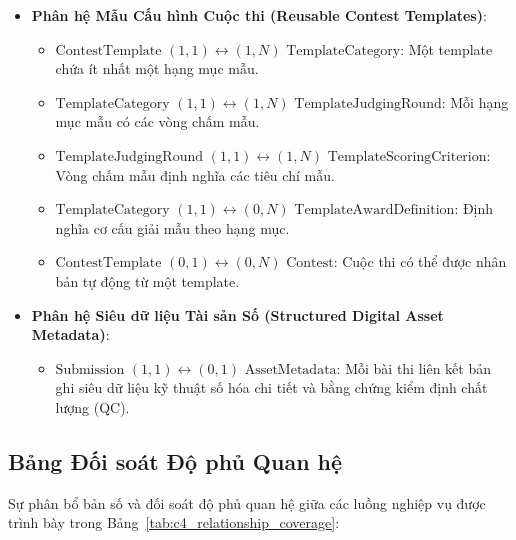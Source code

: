 \begin{itemize}
    \item \textbf{Phân hệ Mẫu Cấu hình Cuộc thi (Reusable Contest Templates)}:
    \begin{itemize}
        \item $\text{ContestTemplate } (1,1) \longleftrightarrow (1,N) \text{ TemplateCategory}$: Một template chứa ít nhất một hạng mục mẫu.
        \item $\text{TemplateCategory } (1,1) \longleftrightarrow (1,N) \text{ TemplateJudgingRound}$: Mỗi hạng mục mẫu có các vòng chấm mẫu.
        \item $\text{TemplateJudgingRound } (1,1) \longleftrightarrow (1,N) \text{ TemplateScoringCriterion}$: Vòng chấm mẫu định nghĩa các tiêu chí mẫu.
        \item $\text{TemplateCategory } (1,1) \longleftrightarrow (0,N) \text{ TemplateAwardDefinition}$: Định nghĩa cơ cấu giải mẫu theo hạng mục.
        \item $\text{ContestTemplate } (0,1) \longleftrightarrow (0,N) \text{ Contest}$: Cuộc thi có thể được nhân bản tự động từ một template.
    \end{itemize}
    \item \textbf{Phân hệ Siêu dữ liệu Tài sản Số (Structured Digital Asset Metadata)}:
    \begin{itemize}
        \item $\text{Submission } (1,1) \longleftrightarrow (0,1) \text{ AssetMetadata}$: Mỗi bài thi liên kết bản ghi siêu dữ liệu kỹ thuật số hóa chi tiết và bằng chứng kiểm định chất lượng (QC).
    \end{itemize}
\end{itemize}

\subsection{Bảng Đối soát Độ phủ Quan hệ}
Sự phân bổ bản số và đối soát độ phủ quan hệ giữa các luồng nghiệp vụ được trình bày trong Bảng~\ref{tab:c4_relationship_coverage}:

